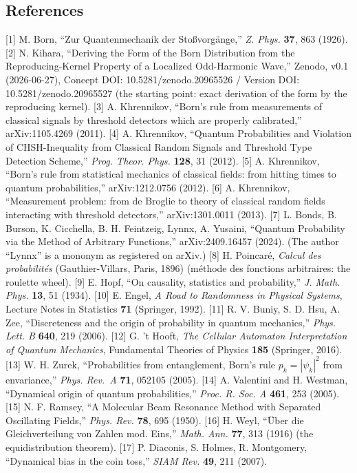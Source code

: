 \documentclass[
]{ltjsarticle}
\begin{document}
\subsection{References}\label{references}

{[}1{]} M. Born, ``Zur Quantenmechanik der Stoßvorgänge,'' \emph{Z.
Phys.} \textbf{37}, 863 (1926). {[}2{]} N. Kihara, ``Deriving the Form
of the Born Distribution from the Reproducing-Kernel Property of a
Localized Odd-Harmonic Wave,'' Zenodo, v0.1 (2026-06-27), Concept DOI:
10.5281/zenodo.20965526 / Version DOI: 10.5281/zenodo.20965527 (the
starting point: exact derivation of the form by the reproducing kernel).
{[}3{]} A. Khrennikov, ``Born's rule from measurements of classical
signals by threshold detectors which are properly calibrated,''
arXiv:1105.4269 (2011). {[}4{]} A. Khrennikov, ``Quantum Probabilities
and Violation of CHSH-Inequality from Classical Random Signals and
Threshold Type Detection Scheme,'' \emph{Prog. Theor. Phys.}
\textbf{128}, 31 (2012). {[}5{]} A. Khrennikov, ``Born's rule from
statistical mechanics of classical fields: from hitting times to quantum
probabilities,'' arXiv:1212.0756 (2012). {[}6{]} A. Khrennikov,
``Measurement problem: from de Broglie to theory of classical random
fields interacting with threshold detectors,'' arXiv:1301.0011 (2013).
{[}7{]} L. Bonds, B. Burson, K. Cicchella, B. H. Feintzeig, Lynnx, A.
Yusaini, ``Quantum Probability via the Method of Arbitrary Functions,''
arXiv:2409.16457 (2024). (The author ``Lynnx'' is a mononym as
registered on arXiv.) {[}8{]} H. Poincaré, \emph{Calcul des
probabilités} (Gauthier-Villars, Paris, 1896) (méthode des fonctions
arbitraires: the roulette wheel). {[}9{]} E. Hopf, ``On causality,
statistics and probability,'' \emph{J. Math. Phys.} \textbf{13}, 51
(1934). {[}10{]} E. Engel, \emph{A Road to Randomness in Physical
Systems}, Lecture Notes in Statistics \textbf{71} (Springer, 1992).
{[}11{]} R. V. Buniy, S. D. Hsu, A. Zee, ``Discreteness and the origin
of probability in quantum mechanics,'' \emph{Phys. Lett. B}
\textbf{640}, 219 (2006). {[}12{]} G. 't Hooft, \emph{The Cellular
Automaton Interpretation of Quantum Mechanics}, Fundamental Theories of
Physics \textbf{185} (Springer, 2016). {[}13{]} W. H. Zurek,
``Probabilities from entanglement, Born's rule \(p_k=|\psi_k|^2\) from
envariance,'' \emph{Phys. Rev.~A} \textbf{71}, 052105 (2005). {[}14{]}
A. Valentini and H. Westman, ``Dynamical origin of quantum
probabilities,'' \emph{Proc. R. Soc. A} \textbf{461}, 253 (2005).
{[}15{]} N. F. Ramsey, ``A Molecular Beam Resonance Method with
Separated Oscillating Fields,'' \emph{Phys. Rev.} \textbf{78}, 695
(1950). {[}16{]} H. Weyl, ``Über die Gleichverteilung von Zahlen mod.
Eins,'' \emph{Math. Ann.} \textbf{77}, 313 (1916) (the equidistribution
theorem). {[}17{]} P. Diaconis, S. Holmes, R. Montgomery, ``Dynamical
bias in the coin toss,'' \emph{SIAM Rev.} \textbf{49}, 211 (2007).
\end{document}
